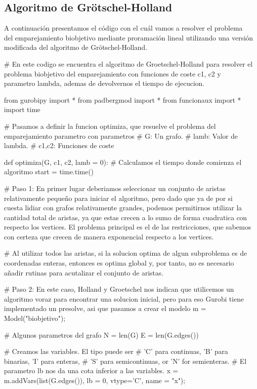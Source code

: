 \documentclass[twoside,a4paper,openright,12pt,tikz]{book}
\begin{document}
\subsection{Algoritmo de Grötschel-Holland}
A continuación presentamos el código con el cuál vamos a resolver el problema del emparejamiento biobjetivo mediante proramación lineal utilizando una versión modificada del algoritmo de Grötschel-Holland. 
\begin{pythone}
# En este codigo se encuentra el algoritmo de Groetschel-Holland para resolver el problema biobjetivo del emparejamiento con funciones de coste c1, c2 y parametro lambda, ademas de devolvernos el tiempo de ejecucion.


from gurobipy import *
from padbergmod import *
from funcionaux import *
import time

# Pasamos a definir la funcion optimiza, que resuelve el problema del emparejamiento parametro con parametros
# G: Un grafo.
# lamb: Valor de lambda.
# c1,c2: Funciones de coste

def optimiza(G, c1, c2, lamb = 0):
    # Calculamos el tiempo donde comienza el algoritmo
    start = time.time()
    
    # Paso 1: En primer lugar deberiamos seleccionar un conjunto de aristas relativamente pequeño para iniciar el algoritmo, pero dado que ya de por si cuesta lidiar con grafos relativamente grandes, podemos permitirnos utilizar la cantidad total de aristas, ya que estas crecen a lo sumo de forma cuadratica con respecto los vertices. El problema principal es el de las restricciones, que sabemos con certeza que crecen de manera exponencial respecto a los vertices. 
    
    # Al utilizar todos las aristas, si la solucion optima de algun subproblema es de coordenadas enteras, entonces es optima global y, por tanto, no es necesario añadir rutinas para acutalizar el conjunto de aristas.
    
    # Paso 2: En este caso, Holland y Groetschel nos indican que utilicemos un algoritmo voraz para encontrar una solucion inicial, pero para eso Gurobi tiene implementado un presolve, asi que pasamos a crear el modelo
    m = Model("biobjetivo");
    
    # Algunos parametros del grafo
    N = len(G)
    E = len(G.edges())
    
    # Creamos las variables. El tipo puede ser 
    # 'C' para continuas, 'B' para binarias, 'I' para enteras,
    # 'S' para semicontinuas, or 'N' for semienteras.
    # El parametro lb nos da una cota inferior a las variables.
    x = m.addVars(list(G.edges()), lb = 0, vtype='C', 
    	name = "x");
    

\end{pythone}
\end{document}
